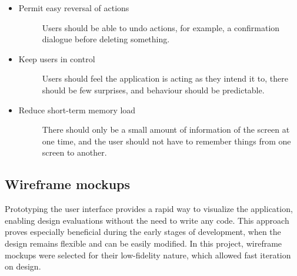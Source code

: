 \begin{itemize}
\begin{description}
    \end{description}
    \item Permit easy reversal of actions
    \begin{description}
        \item[] Users should be able to undo actions, for example, a confirmation dialogue before deleting something.
    \end{description}
    \item Keep users in control
    \begin{description}
        \item[] Users should feel the application is acting as they intend it to, there should be few surprises, and behaviour should be predictable.
    \end{description}
    \item Reduce short-term memory load
    \begin{description}
        \item[] There should only be a small amount of information of the screen at one time, and the user should not have to remember things from one screen to another.
    \end{description}
\end{itemize}

\subsection{Wireframe mockups}
Prototyping the user interface provides a rapid way to visualize the application, enabling design evaluations without the need to write any code. This approach proves especially beneficial during the early stages of development, when the design remains flexible and can be easily modified. In this project, wireframe mockups were selected for their low-fidelity nature, which allowed fast iteration on design.

